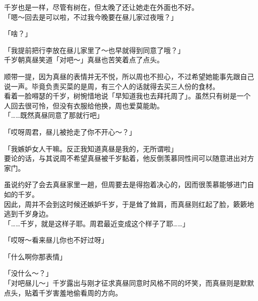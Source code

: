 千岁也是一样，尽管有树在，但太晚了还让她走在外面也不好。\\

「嗯～回去是可以啦，不过我今晚要在昼儿家过夜哦？」

「啥？」

「我提前把行李放在昼儿家里了～也早就得到同意了哦？」\\

千岁朝真昼笑道「对吧～」真昼也苦笑着点了点头。

顺带一提，因为真昼的表情并无不悦，所以周也不担心，不过希望她能事先跟自己说一声。毕竟负责买菜的是周，有三个人的话就得去买三人份的食材。\\

看着一脸嘚瑟的千岁，树惋惜地说「早知道我也去拜托周了」。虽然只有树是一个人回去很可怜，但没有衣服给他换，周也爱莫能助。\\

「……既然真昼同意了那就行吧」

「哎呀周君，昼儿被抢走了你不开心～？」

「我嫉妒女人干嘛。反正我知道真昼是我的，无所谓啦」\\

要论的话，与其说周不希望真昼被千岁黏着，他反倒羡慕同性间可以随意进出对方家门。

虽说约好了会去真昼家里一趟，但周要去是得抱着决心的，因而很羡慕能够进门自如的千岁。\\

因此，周并不会到这时候还嫉妒千岁，于是耸了耸肩，而真昼则红起了脸，簌簌地逃到千岁身边。\\

「……千岁，就是这样子耶。周君最近变成这个样子了耶……」

「哎呀～看来昼儿你也不好过呀」

「什么啊你那表情」

「没什么～？」\\

「对吧昼儿～」千岁露出与刚才征求真昼同意时风格不同的坏笑，而真昼则是默默点头，贴着千岁害羞地偷看周的方向。
